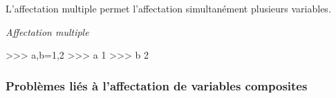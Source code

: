 \documentclass[10pt,fleqn]{article} %
\begin{document}
L'affectation multiple permet l'affectation simultanément plusieurs variables.

\begin{exemple}
\textit{Affectation multiple}


\begin{minipage}[c]{.55\linewidth}
\begin{py}
\begin{python}
>>> a,b=1,2
>>> a
    1
>>> b
    2
\end{python}
\end{py}
\end{minipage}

\end{exemple}


\subsubsection{Problèmes liés à l'affectation de variables composites}
\end{document}
